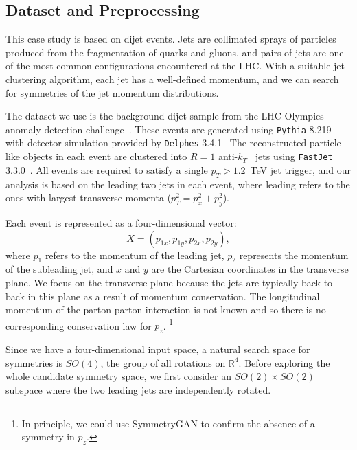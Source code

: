 \documentclass[aps,prx,reprint,preprintnumbers,superscriptaddress,nofootinbib,longbibliography,floatfix]{revtex4-1}
\newcommand{\R}{\mathbb{R}}
\begin{document}
\subsection{Dataset and Preprocessing}

This case study is based on dijet events.
%
Jets are collimated sprays of particles produced from the fragmentation of quarks and gluons, and pairs of jets are one of the most common configurations encountered at the LHC.
%
With a suitable jet clustering algorithm, each jet has a well-defined momentum, and we can search for symmetries of the jet momentum distributions.

The dataset we use is the background dijet sample from the LHC Olympics anomaly detection challenge~\cite{gregor_kasieczka_2019_4536377,Kasieczka:2021xcg}.
%
These events are generated using \texttt{Pythia} 8.219~\cite{Sjostrand:2006za,Sjostrand:2007gs} with detector simulation provided by \texttt{Delphes} 3.4.1~\cite{deFavereau:2013fsa,Mertens:2015kba,Selvaggi:2014mya}
%
The reconstructed particle-like objects in each event are clustered into
$R=1$ anti-$k_T$~\cite{Cacciari:2008gp} jets using \texttt{FastJet} 3.3.0~\cite{Cacciari:2011ma,Cacciari:2005hq}.
%
All events are required to satisfy a single $p_T>1.2$~TeV jet trigger, and our analysis is based on the leading two jets in each event, where leading refers to the ones with largest transverse momenta ($p_T^2 = {p_x^2 + p_y^2}$).


Each event is represented as a four-dimensional vector:
%
\begin{equation}
X = (p_{1x},p_{1y},p_{2x},p_{2y}),
\end{equation}
%
where $p_1$ refers to the momentum of the leading jet, $p_2$ represents the momentum of the subleading jet, and $x$ and $y$ are the Cartesian coordinates in the transverse plane.
%
We focus on the transverse plane because the jets are typically back-to-back in this plane as a result of momentum conservation.
%
The longitudinal momentum of the parton-parton interaction is not known and so there is no corresponding conservation law for $p_z$.%
%
\footnote{In principle, we could use SymmetryGAN to confirm the absence of a symmetry in $p_z$.}

Since we have a four-dimensional input space, a natural search space for symmetries is $SO(4)$, the group of all rotations on $\R^4$.  Before exploring the whole candidate symmetry space, we first consider an $SO(2)\times SO(2)$ subspace where the two leading jets are independently rotated.
\end{document}
